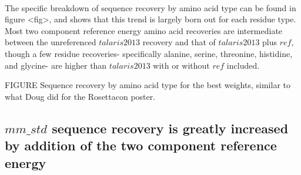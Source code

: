 \paragraph{}
The specific breakdown of sequence recovery by amino acid type can be found in figure <fig>, and shows that this trend is largely born out for each residue type.
Most two component reference energy amino acid recoveries are intermediate between the unreferenced $talaris2013$ recovery and that of $talaris2013$ plus $ref$, though a few residue recoveries- specifically alanine, serine, threonine, histidine, and glycine- are higher than $talaris2013$ with or without $ref$ included.

FIGURE Sequence recovery by amino acid type for the best weights, similar to what Doug did for the Rosettacon poster.


\subsection{$mm\_std$ sequence recovery is greatly increased by addition of the two component reference energy}


